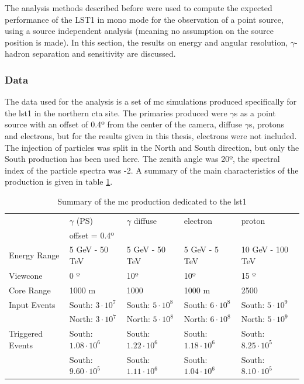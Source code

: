 \documentclass[main.tex]{subfiles}
\begin{document}
The analysis methods described before were used to compute the expected performance of the LST1 in mono mode for the observation of a point source, using a source independent analysis (meaning no assumption on the source position is made). In this section, the results on energy and angular resolution, $\gamma$-hadron separation and sensitivity are discussed.

\subsubsection{Data} \label{sec:mcdata}

The data used for the analysis is a set of \gls{mc} simulations produced specifically for the \gls{lst}1 in the northern \gls{cta} site. The primaries produced were $\gamma$s as a point source with an offset of 0.4º from the center of the camera, diffuse $\gamma$s, protons and electrons, but for the results given in this thesis, electrons were not included. The injection of particles was split in the North and South direction, but only the South production has been used here. The zenith angle was 20º, the spectral index of the particle spectra was -2. A summary of the main characteristics of the production is given in table \ref{tab:mcprod}.

\begin{table}
  \centering
    \begin{tabular}{|l|l|l|l|l|}
      \hline
      & $\gamma$ (PS) & $\gamma$ diffuse & electron & proton\\
       & offset = 0.4º & & & \\
      \hline
      Energy Range & 5 GeV - 50 TeV & 5 GeV - 50 TeV & 5 GeV - 5 TeV & 10 GeV - 100 TeV\\
      Viewcone     & 0 º  & 10º & 10º & 15 º \\
      Core Range  & 1000 m & 1000 & 1000 m & 2500 \\
      Input Events & South: $3\cdot 10^7$ & South: $5\cdot 10^8$ & South: $6\cdot 10^8$ & South: $5\cdot 10^9$ \\
      & North: $3\cdot 10^7$ & North: $5\cdot 10^8$ & North: $6\cdot 10^8$ & North: $5\cdot 10^9$ \\
      Triggered Events & South: $1.08\cdot 10^6 $ & South: $1.22\cdot 10^6 $ & South: $1.18\cdot 10^6 $ & South: $8.25\cdot 10^5 $ \\
      & South: $9.60\cdot 10^5 $ & South: $1.11\cdot 10^6 $ & South: $1.04\cdot 10^6 $ & South: $8.10\cdot 10^5 $ \\
      \hline
      \end{tabular}
  \caption{Summary of the \gls{mc} production dedicated to the \gls{lst}1}\label{tab:mcprod}
\end{table}
\end{document}
